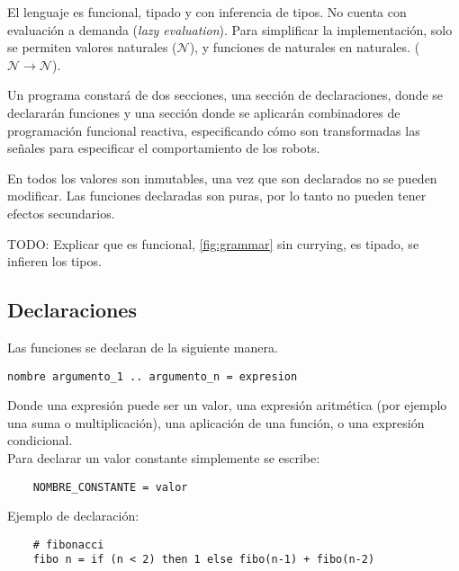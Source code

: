   El lenguaje \frob{} es funcional, tipado y con inferencia de tipos. No
cuenta con evaluación a demanda (\emph{lazy evaluation}).
  Para simplificar la implementación, solo se permiten valores
naturales ($\mathcal{N}$), y funciones de naturales en naturales. 
($\mathcal{N} \rightarrow \mathcal{N}$).

  Un programa constará de dos secciones, una sección de
declaraciones, donde se declararán funciones y una sección donde se
aplicarán combinadores de programación funcional reactiva, especificando
cómo son transformadas las señales para especificar el comportamiento de
los robots.

  En \frob{} todos los valores son inmutables, una vez que son declarados
no se pueden modificar.
  Las funciones declaradas son puras, por lo tanto no pueden tener efectos
secundarios.
  
TODO: Explicar que es funcional, \ref{fig:grammar} sin currying, es tipado, se infieren
los tipos.



\subsection{Declaraciones}

  Las funciones se declaran de la siguiente manera.

\begin{verbatim}
nombre argumento_1 .. argumento_n = expresion
\end{verbatim}

  Donde una expresión puede ser un valor,
una expresión aritmética (por ejemplo una suma o multiplicación),
una aplicación de una función, o una expresión condicional.\\


  Para declarar un valor constante simplemente se escribe:

\begin{verbatim}
    NOMBRE_CONSTANTE = valor
\end{verbatim}

  Ejemplo de declaración:

\begin{verbatim}
    # fibonacci
    fibo n = if (n < 2) then 1 else fibo(n-1) + fibo(n-2)
\end{verbatim}


